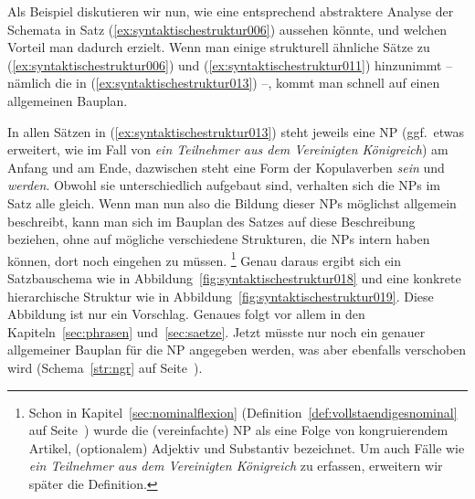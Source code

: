 Als Beispiel diskutieren wir nun, wie eine entsprechend abstraktere Analyse der Schemata in Satz (\ref{ex:syntaktischestruktur006}) aussehen könnte, und welchen Vorteil man dadurch erzielt.
Wenn man einige strukturell ähnliche Sätze zu (\ref{ex:syntaktischestruktur006}) und (\ref{ex:syntaktischestruktur011}) hinzunimmt -- nämlich die in (\ref{ex:syntaktischestruktur013}) --, kommt man schnell auf einen allgemeinen Bauplan.

\begin{exe}
  \ex\label{ex:syntaktischestruktur013}
  \begin{xlist}
  \end{xlist}
\end{exe}

In allen Sätzen in (\ref{ex:syntaktischestruktur013}) steht jeweils eine NP (ggf.\ etwas erweitert, wie im Fall von \textit{ein Teilnehmer aus dem Vereinigten Königreich}) am Anfang und am Ende, dazwischen steht eine Form der Kopulaverben \textit{sein} und \textit{werden}.
Obwohl sie unterschiedlich aufgebaut sind, verhalten sich die NPs im Satz alle gleich.
Wenn man nun also die Bildung dieser NPs möglichst allgemein beschreibt, kann man sich im Bauplan des Satzes auf diese Beschreibung beziehen, ohne auf mögliche verschiedene Strukturen, die NPs intern haben können, dort noch eingehen zu müssen.%
\footnote{Schon in Kapitel~\ref{sec:nominalflexion} (Definition~\ref{def:vollstaendigesnominal} auf Seite~\pageref{def:vollstaendigesnominal}) wurde die (vereinfachte) NP als eine Folge von kongruierendem Artikel, (optionalem) Adjektiv und Substantiv bezeichnet.
Um auch Fälle wie \textit{ein Teilnehmer aus dem Vereinigten Königreich} zu erfassen, erweitern wir später die Definition.}
Genau daraus ergibt sich ein Satzbauschema wie in Abbildung~\ref{fig:syntaktischestruktur018} und eine konkrete hierarchische Struktur wie in Abbildung~\ref{fig:syntaktischestruktur019}.
Diese Abbildung ist nur ein Vorschlag.
Genaues folgt vor allem in den Kapiteln~\ref{sec:phrasen} und~\ref{sec:saetze}.
Jetzt müsste nur noch ein genauer allgemeiner Bauplan für die NP angegeben werden, was aber ebenfalls verschoben wird (Schema~\ref{str:ngr} auf Seite~\pageref{str:ngr}).

